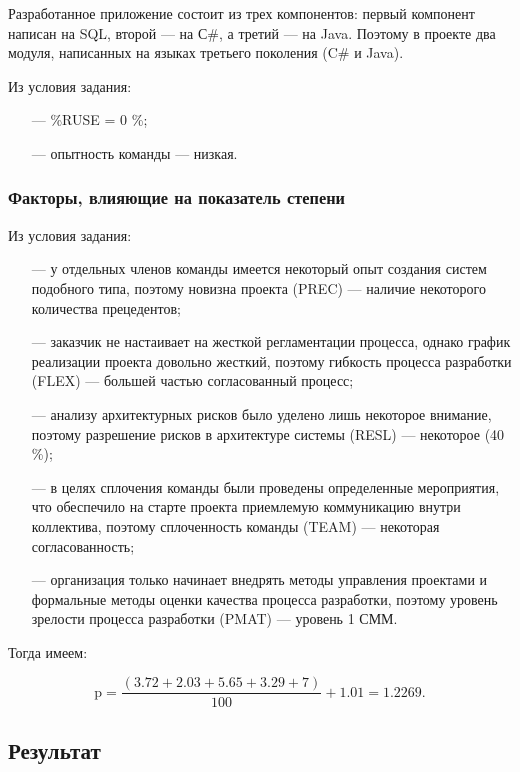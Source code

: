 Разработанное приложение состоит из трех компонентов: первый компонент написан
на SQL, второй --- на С\#, а третий --- на Java. Поэтому в проекте два модуля,
написанных на языках третьего поколения (C\# и Java).

Из условия задания:

\begin{itemize}
    \item[---] \%RUSE = 0 \%;
    \item[---] опытность команды --- низкая.
\end{itemize}

\subsubsection{Факторы, влияющие на показатель степени}

Из условия задания:

\begin{itemize}
    \item[---] у отдельных членов команды имеется некоторый опыт создания систем подобного типа, поэтому новизна проекта (PREC) --- наличие некоторого количества прецедентов;
    \item[---] заказчик не настаивает на жесткой регламентации процесса, однако график реализации проекта довольно жесткий, поэтому гибкость процесса разработки (FLEX) --- большей частью согласованный процесс;
    \item[---] анализу архитектурных рисков было уделено лишь некоторое внимание, поэтому разрешение рисков в архитектуре системы (RESL) --- некоторое (40 \%);
    \item[---] в целях сплочения команды были проведены определенные мероприятия, что обеспечило на старте проекта приемлемую коммуникацию внутри коллектива, поэтому сплоченность команды (TEAM) --- некоторая согласованность;
    \item[---] организация только начинает внедрять методы управления проектами и формальные методы оценки качества процесса разработки, поэтому уровень зрелости процесса разработки (PMAT) --- уровень 1 СММ.
\end{itemize}

Тогда имеем:

$$\text{p} = \frac{(3.72 + 2.03 + 5.65 + 3.29 + 7)}{100} + 1.01 = 1.2269.$$

\subsection*{Результат}

